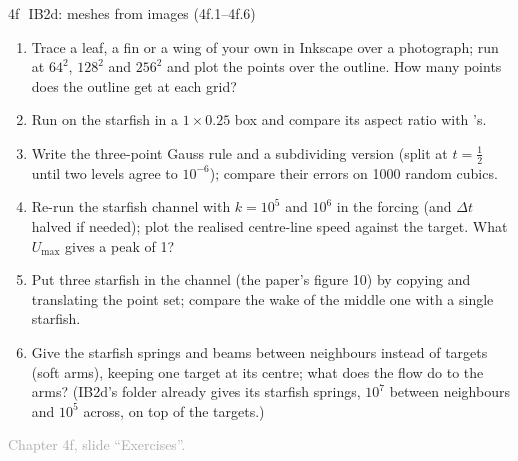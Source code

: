 \documentclass[aspectratio=169,11pt]{beamer}
\newcommand{\sourcecredit}[1]{\vfill\begin{flushright}\tiny\textcolor{DarkGray}{#1}\end{flushright}}
\begin{document}
\begin{frame}{4f\,\textbullet\ IB2d: meshes from images (4f.1--4f.6)}
\label{fr:c4fx1}
\small
\begin{enumerate}
  \item[4f.1] Trace a leaf, a fin or a wing of your own in Inkscape over a photograph; run  at $64^2$, $128^2$ and $256^2$ and plot the points over the outline. How many points does the outline get at each grid?
  \item[4f.2] Run  on the starfish in a $1 \times 0.25$ box and compare its aspect ratio with 's.
  \item[4f.3] Write the three-point Gauss rule and a subdividing version (split at $t = \frac12$ until two levels agree to $10^{-6}$); compare their errors on 1000 random cubics.
  \item[4f.4] Re-run the starfish channel with $k = 10^5$ and $10^6$ in the forcing (and $\Delta t$ halved if needed); plot the realised centre-line speed against the target. What $U_{\max}$ gives a peak of 1?
  \item[4f.5] Put three starfish in the channel (the paper's figure 10) by copying and translating the point set; compare the wake of the middle one with a single starfish.
  \item[4f.6] Give the starfish springs and beams between neighbours instead of targets (soft arms), keeping one target at its centre; what does the flow do to the arms? (IB2d's  folder already gives its starfish springs, $10^7$ between neighbours and $10^5$ across, on top of the targets.)
\end{enumerate}
\sourcecredit{Chapter 4f, slide ``Exercises''.}
\end{frame}
\end{document}
